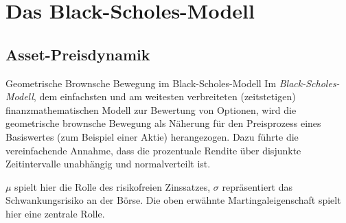 \section{Das Black-Scholes-Modell}

\subsection{Asset-Preisdynamik}

\begin{example}{Geometrische Brownsche Bewegung im Black-Scholes-Modell}
    Im \emph{Black-Scholes-Modell}, dem einfachsten und am weitesten verbreiteten (zeitstetigen) finanzmathematischen Modell zur Bewertung von Optionen, wird die geometrische brownsche Bewegung als Näherung für den Preisprozess eines Basiswertes (zum Beispiel einer Aktie) herangezogen.
    Dazu führte die vereinfachende Annahme, dass die prozentuale Rendite über disjunkte Zeitintervalle unabhängig und normalverteilt ist.

    $\mu$ spielt hier die Rolle des risikofreien Zinssatzes, $\sigma$ repräsentiert das Schwankungsrisiko an der Börse.
    Die oben erwähnte Martingaleigenschaft spielt hier eine zentrale Rolle.
\end{example}

